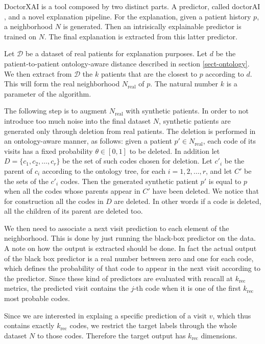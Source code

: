 \documentclass[]{marticle}
\newcommand{\ds}{\mathcal{D}}
\begin{document}
DoctorXAI \cite{panigutti-xai} is a tool composed by two distinct parts. A predictor, called
doctorAI \cite{paper-doctor-ai}, and a novel explanation pipeline.  For the explanation, given a patient history $p$, a neighborhood $N$ is generated. Then an
intrisically explainable predictor is trained on $N$. The final explanation is extracted from this
latter predictor.

\newcommand{\realds}{N_\text{real}}

Let $\ds$ be a dataset of real patients for explanation purposes. Let $d$ be the patient-to-patient
ontology-aware distance described in section \ref{sect-ontology}. We then extract from $\ds$ the $k$
patients that are the closest to $p$ according to $d$. This will form the real neighborhood
$\realds$ of $p$. The natural number $k$ is a parameter of the algorithm.

The following step is to augment $\realds$ with synthetic patients. In order to not introduce too
much noise into the final dataset $N$, synthetic patients are generated only through deletion from
real patients. The deletion is performed in an ontology-aware manner, as follows: given a patient
$p'\in \realds$, each code of its visits has a fixed probability $\theta\in [0,1]$ to be deleted. In
addition let $D=\{c_1, c_2, \dots, c_r\}$ be the set of such codes chosen for deletion. Let $c'_i$
be the parent of $c_i$ according to the ontology tree, for each $i=1,2,\dots,r$, and let $C'$ be the
sets of the $c'_i$ codes. Then the generated synthetic patient $p'$ is equal to $p$ when all the
codes whose parents appear in $C'$ have been deleted. We notice that for construction all the codes
in $D$ are deleted. In other words if a code is deleted, all the children of its parent are deleted
too.

We then need to associate a next visit prediction to each element of the neighborhood. This is done
by just running the black-box predictor on the data. A note on how the output is extracted should be
done. In fact the actual output of the black box predictor is a real number between zero and one for
each code, which defines the probability of that code to appear in the next visit according to the
predictor. Since these kind of predictors are evaluated with reacall at $k_\text{rec}$ metrics, the
predicted visit contains the $j$-th code when it is one of the first $k_\text{rec}$ most probable
codes. 

Since we are interested in explaing a specific prediction of a visit $v$, which thus contains
exactly $k_\text{rec}$ codes, we restrict the target labels through the whole dataset $N$ to those
codes. Therefore the target output has $k_\text{rec}$ dimensions.
\end{document}
